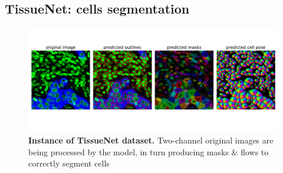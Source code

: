 \documentclass{article}
\begin{document}




\subsection{TissueNet: cells segmentation}

\begin{figure}
    \centering
	\includegraphics[width=5in]{img/tissuenet.pdf}
	\caption{{\bf Instance of TissueNet dataset.} Two-channel original images are being processed by the model, in turn producing masks \& flows to correctly segment cells}
	\label{fig:tissue_example}
\end{figure} 
\end{document}
